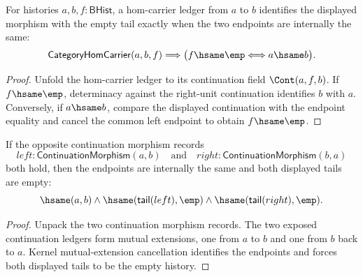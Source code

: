 
\begin{theorem}
\label{thm:category-hom-carrier-morphism-empty-endpoint-iff}
For histories $a,b,f:\mathsf{BHist}$, a hom-carrier ledger from $a$ to $b$
identifies the displayed morphism with the empty tail exactly when the two
endpoints are internally the same:
$$
\mathsf{CategoryHomCarrier}(a,b,f)\Longrightarrow
\bigl(f\hsame\emp\Longleftrightarrow a\hsame b\bigr).
$$
\end{theorem}
\begin{proof}
Unfold the hom-carrier ledger to its continuation field $\Cont(a,f,b)$. If
$f\hsame\emp$, determinacy against the right-unit continuation identifies
$b$ with $a$. Conversely, if $a\hsame b$, compare the displayed continuation
with the endpoint equality and cancel the common left endpoint to obtain
$f\hsame\emp$.
\end{proof}

\begin{theorem}
\label{thm:continuation-morphism-cycle-tails-empty}
If the opposite continuation morphism records
$$
left:\mathsf{ContinuationMorphism}(a,b)
\quad\text{and}\quad
right:\mathsf{ContinuationMorphism}(b,a)
$$
both hold, then the endpoints are internally the same and both displayed tails
are empty:
$$
\hsame(a,b)\land
\hsame(\mathsf{tail}(left),\emp)\land
\hsame(\mathsf{tail}(right),\emp).
$$
\end{theorem}
\begin{proof}
Unpack the two continuation morphism records. The two exposed continuation
ledgers form mutual extensions, one from $a$ to $b$ and one from $b$ back to
$a$. Kernel mutual-extension cancellation identifies the endpoints and forces
both displayed tails to be the empty history.
\end{proof}

